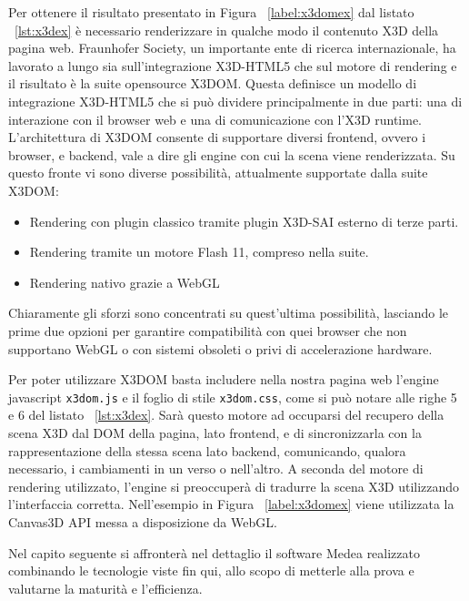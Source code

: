 Per ottenere il risultato presentato in Figura ~\ref{label:x3domex} dal listato ~\ref{lst:x3dex} è \mbox{necessario} renderizzare in qualche modo il contenuto X3D della pagina web. 
Fraunhofer Society, un importante ente di ricerca internazionale, ha lavorato a lungo sia sull'integrazione X3D-HTML5 che sul motore di rendering e il risultato è la suite opensource X3DOM. Questa definisce un modello di integrazione X3D-HTML5 che si può dividere principalmente in due parti: una di interazione con il browser web e una di comunicazione con l'X3D runtime. L'architettura di X3DOM consente di supportare diversi frontend, ovvero i browser, e backend, vale a dire gli engine con cui la scena viene renderizzata. Su questo fronte vi sono diverse possibilità, attualmente supportate dalla suite X3DOM: 
\begin{itemize}
	\item Rendering con plugin classico tramite plugin X3D-SAI esterno di terze parti.
	\item Rendering tramite un motore Flash 11, compreso nella suite.
    \item Rendering nativo grazie a WebGL
\end{itemize}
Chiaramente gli sforzi sono concentrati su quest'ultima possibilità, lasciando le prime due opzioni per garantire compatibilità con quei browser che non supportano WebGL o con sistemi obsoleti o privi di accelerazione hardware.

Per poter utilizzare X3DOM basta includere nella nostra pagina web l'engine javascript \texttt{x3dom.js} e il foglio di stile \texttt{x3dom.css}, come si può notare alle righe 5 e 6 del listato ~\ref{lst:x3dex}. Sarà questo motore ad occuparsi del recupero della scena X3D dal DOM della pagina, lato frontend, e di sincronizzarla con la rappresentazione della stessa scena lato backend, comunicando, qualora necessario, i cambiamenti in un verso o nell'altro. A seconda del motore di rendering utilizzato, l'engine si preoccuperà di tradurre la scena X3D utilizzando l'interfaccia corretta. Nell'esempio in Figura ~\ref{label:x3domex} viene utilizzata la Canvas3D API messa a disposizione da WebGL.

Nel capito seguente si affronterà nel dettaglio il software Medea realizzato combinando le tecnologie viste fin qui, allo scopo di metterle alla prova e valutarne la maturità e l'efficienza.
